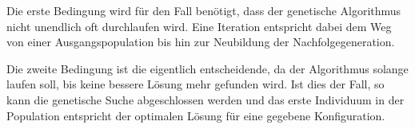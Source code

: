 Die erste Bedingung wird für den Fall benötigt, dass der genetische Algorithmus nicht unendlich oft durchlaufen wird. Eine Iteration entspricht dabei dem Weg von einer Ausgangspopulation bis hin zur Neubildung der Nachfolgegeneration.

Die zweite Bedingung ist die eigentlich entscheidende, da der Algorithmus solange laufen soll, bis keine bessere Lösung mehr gefunden wird. Ist dies der Fall, so kann die genetische Suche abgeschlossen werden und das erste Individuum in der Population entspricht der optimalen Lösung für eine gegebene Konfiguration.
